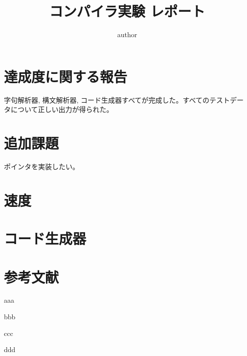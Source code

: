\documentclass{jsarticle}
\begin{document}
 \makeatletter
    \renewcommand{\thefigure}{
    \thesection.\arabic{figure}}
  \makeatother

  \makeatletter
    \renewcommand{\thetable}{%
    \thesection.\arabic{table}}
  \makeatother

\title{コンパイラ実験 レポート}
\author{author}
\maketitle


\section{達成度に関する報告}

字句解析器, 構文解析器, コード生成器すべてが完成した。すべてのテストデータについて正しい出力が得られた。

\section{追加課題}

ポインタを実装したい。

\section{速度}



\section{コード生成器}


\section{参考文献}

\begin{thebibliography}{99}
 \item aaa
 \item bbb
 \item ccc
 \item ddd
\end{thebibliography}
\end{document}
